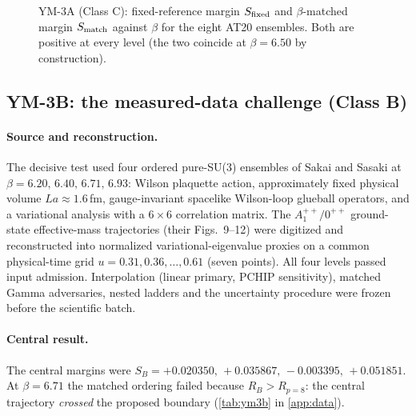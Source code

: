 \documentclass[11pt,a4paper]{article}
\theoremstyle{definition}
\theoremstyle{remark}
\begin{document}
\begin{figure}[t]
\centering
{}
\caption{YM-3A (Class C): fixed-reference margin $S_{\rm fixed}$ and $\beta$-matched margin $S_{\rm match}$ against $\beta$ for the eight AT20 ensembles. Both are positive at every level (the two coincide at $\beta=6.50$ by construction).}\label{fig:ym3a}
\end{figure}

\subsection{YM-3B: the measured-data challenge (Class B)}
\paragraph{Source and reconstruction.} The decisive test used four ordered pure-SU(3) ensembles of Sakai and Sasaki \cite{SS23} at $\beta=6.20,\,6.40,\,6.71,\,6.93$: Wilson plaquette action, approximately fixed physical volume $La\approx1.6$\,fm, gauge-invariant spacelike Wilson-loop glueball operators, and a variational analysis with a $6\times6$ correlation matrix. The $A_1^{++}/0^{++}$ ground-state effective-mass trajectories (their Figs.~9--12) were digitized and reconstructed into normalized variational-eigenvalue proxies on a common physical-time grid $u=0.31,0.36,\dots,0.61$ (seven points). All four levels passed input admission. Interpolation (linear primary, PCHIP sensitivity), matched Gamma adversaries, nested ladders and the uncertainty procedure were frozen before the scientific batch.

\paragraph{Central result.} The central margins were $S_B=+0.020350,\,+0.035867,\,-0.003395,\,+0.051851$. At $\beta=6.71$ the matched ordering failed because $R_B>R_{p=8}$: the central trajectory \emph{crossed} the proposed boundary (\cref{tab:ym3b} in \cref{app:data}).
\end{document}
